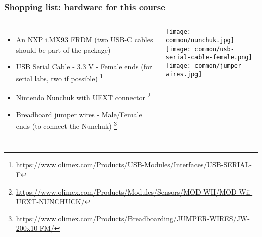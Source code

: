 \begin{frame}
\frametitle{Shopping list: hardware for this course}
  \begin{columns}
    \footnotesize
    \begin{itemize}
      \item An NXP i.MX93 FRDM (two USB-C cables should be part of the package)
      \item USB Serial Cable - 3.3 V - Female ends (for serial labs, two if possible)
            \footnote{\tiny \url{https://www.olimex.com/Products/USB-Modules/Interfaces/USB-SERIAL-F}}
      \item Nintendo Nunchuk with UEXT connector
            \footnote{\tiny \url{https://www.olimex.com/Products/Modules/Sensors/MOD-WII/MOD-Wii-UEXT-NUNCHUCK/}}
      \item Breadboard jumper wires - Male/Female ends (to connect the Nunchuk)
            \footnote{\tiny \url{https://www.olimex.com/Products/Breadboarding/JUMPER-WIRES/JW-200x10-FM/}}
    \end{itemize}
    \texttt{[image: common/nunchuk.jpg]} \\
    \texttt{[image: common/usb-serial-cable-female.png]} \\
    \texttt{[image: common/jumper-wires.jpg]}
  \end{columns}
\end{frame}
